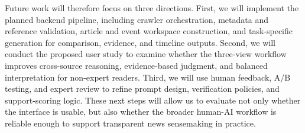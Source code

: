 \documentclass{vgtc}                          %
\begin{document}
Future work will therefore focus on three directions. First, we will implement the planned backend pipeline, including crawler orchestration, metadata and reference validation, article and event workspace construction, and task-specific generation for comparison, evidence, and timeline outputs. Second, we will conduct the proposed user study to examine whether the three-view workflow improves cross-source reasoning, evidence-based judgment, and balanced interpretation for non-expert readers. Third, we will use human feedback, A/B testing, and expert review to refine prompt design, verification policies, and support-scoring logic. These next steps will allow us to evaluate not only whether the interface is usable, but also whether the broader human-AI workflow is reliable enough to support transparent news sensemaking in practice.




%

%
%
%


\end{document}
